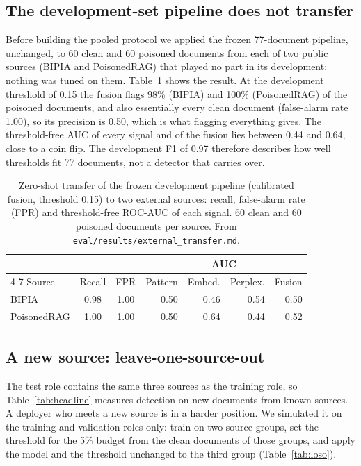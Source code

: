 \subsection{The development-set pipeline does not transfer}
\label{sec:transfer}
Before building the pooled protocol we applied the frozen 77-document pipeline,
unchanged, to 60 clean and 60 poisoned documents from each of two public sources
(BIPIA and PoisonedRAG) that played no part in its development; nothing was tuned
on them. Table~\ref{tab:transfer} shows the result. At the development threshold
of 0.15 the fusion flags 98\% (BIPIA) and 100\% (PoisonedRAG) of the poisoned
documents, and also essentially every clean document (false-alarm rate 1.00), so
its precision is 0.50, which is what flagging everything gives. The
threshold-free AUC of every signal and of the fusion lies between 0.44 and 0.64,
close to a coin flip. The development F1 of 0.97 therefore describes how well
thresholds fit 77 documents, not a detector that carries over.

\begin{table}[t]
\caption{Zero-shot transfer of the frozen development pipeline (calibrated fusion, threshold 0.15) to two external sources: recall, false-alarm rate (FPR) and threshold-free ROC-AUC of each signal. 60 clean and 60 poisoned documents per source. From \texttt{eval/results/external\_transfer.md}.}
\label{tab:transfer}
\centering
\footnotesize
\setlength{\tabcolsep}{4pt}
\begin{tabular}{@{}lccrrrr@{}}
\toprule
 & & & \multicolumn{4}{c}{AUC} \\
\cmidrule(l){4-7}
Source & Recall & FPR & Pattern & Embed. & Perplex. & Fusion \\
\midrule
BIPIA & 0.98 & 1.00 & 0.50 & 0.46 & 0.54 & 0.50 \\
PoisonedRAG & 1.00 & 1.00 & 0.50 & 0.64 & 0.44 & 0.52 \\
\bottomrule
\end{tabular}
\end{table}

\subsection{A new source: leave-one-source-out}
\label{sec:loso}
The test role contains the same three sources as the training role, so
Table~\ref{tab:headline} measures detection on new documents from known
sources. A deployer who meets a new source is in a harder position. We simulated
it on the training and validation roles only: train on two source groups, set the
threshold for the 5\% budget from the clean documents of those groups, and apply
the model and the threshold unchanged to the third group (Table~\ref{tab:loso}).

